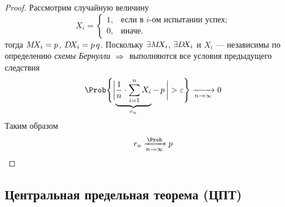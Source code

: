 \begin{proof}
	Рассмотрим случайную величину
	\[
		X_i = \begin{cases*}
		1, & \text{если в $i$-ом испытании успех;} \\
		0, & \text{иначе.}
		\end{cases*}
	\]
	тогда $M\!X_i = p$, $D\!X_i = p\,q$. Поскольку $\exists M\!X_i$, $\exists D\!X_i$ и $X_i$ --- независимы по определению \emph{схемы Бернулли} $\;\Rightarrow\;$ выполняются все условия предыдущего следствия
	\[
		\Prob\Biggl\{ \biggl| \underbrace{\frac{1}{n} \cdot \sum_{i = 1}^{n} X_i}_{r_n} -\, p\, \biggr| > \varepsilon \Biggr\} \xrightarrow[n\to\infty]{} 0
	\]
	Таким образом
	\[
		r_n \xrightarrow[n\to\infty]{\Prob} p
	\]
\end{proof}


\subsection{Центральная предельная теорема (ЦПТ)}